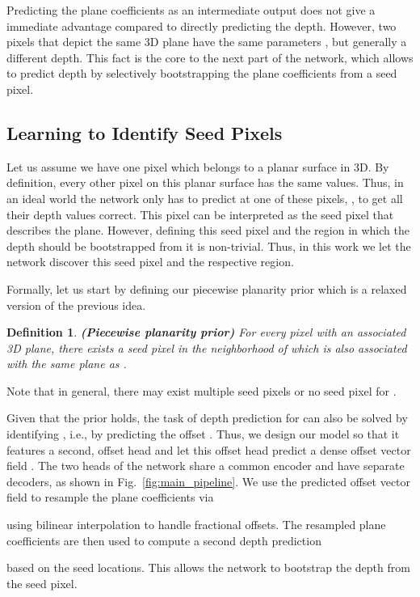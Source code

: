 \documentclass[final]{cvpr}
\newtheorem{definition}{Definition}
\begin{document}
Predicting the plane coefficients as an intermediate output does not give a immediate advantage compared to directly predicting the depth. However, two pixels that depict the same 3D plane have the same parameters , but generally a different depth. This fact is the core to the next part of the network, which allows to predict depth by selectively bootstrapping the plane coefficients from a seed pixel. 

\subsection{Learning to Identify Seed Pixels}
\label{sec:method:seed:pixels}

Let us assume we have one pixel  which belongs to a planar surface in 3D. By definition, every other pixel on this planar surface has the same  values. Thus, in an ideal world the network only has to predict  at one of these pixels, , to get all their depth values correct. This pixel can be interpreted as the seed pixel that describes the plane. However, defining this seed pixel and the region in which the depth should be bootstrapped from it is non-trivial. Thus, in this work we let the network discover this seed pixel and the respective region.

Formally, let us start by defining our piecewise planarity prior which is a relaxed version of the previous idea.
\begin{definition} \label{def:piecewise:planarity:prior}
\textbf{(Piecewise planarity prior)} For every pixel  with an associated 3D plane, there exists a seed pixel  in the neighborhood of  which is also associated with the same plane as .
\end{definition}
Note that in general, there may exist multiple seed pixels or no seed pixel for .

Given that the prior holds, the task of depth prediction for  can also be solved by identifying , i.e., by predicting the offset . Thus, we design our model so that it features a second, offset head and let this offset head predict a dense offset vector field . The two heads of the network share a common encoder and have separate decoders, as shown in Fig.~\ref{fig:main_pipeline}. We use the predicted offset vector field to resample the plane coefficients via

using bilinear interpolation to handle fractional offsets. The resampled plane coefficients are then used to compute a second depth prediction 

based on the seed locations. This allows the network to bootstrap the depth from the seed pixel. 
\end{document}
